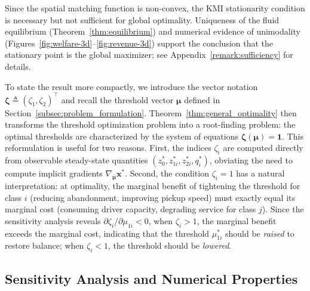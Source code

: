 \begin{remark}
\label{remark:global_optimality}
Since the spatial matching function is non-convex, the KMI stationarity condition is necessary but not sufficient for global optimality.
Uniqueness of the fluid equilibrium (Theorem~\ref{thm:equilibrium}) and numerical evidence of unimodality (Figures~\ref{fig:welfare-3d}--\ref{fig:revenue-3d}) support the conclusion that the stationary point is the global maximizer; see Appendix~\ref{remark:sufficiency} for details.
\end{remark}

To state the result more compactly, we introduce the vector notation $\boldsymbol{\zeta} \triangleq (\zeta_1, \zeta_2)^\top$ and recall the threshold vector $\boldsymbol{\mu}$ defined in Section~\ref{subsec:problem_formulation}.
Theorem~\ref{thm:general_optimality} then transforms the threshold optimization problem into a root-finding problem: the optimal thresholds are characterized by the system of equations $\boldsymbol{\zeta}(\boldsymbol{\mu}) = \mathbf{1}$.
This reformulation is useful for two reasons.
First, the indices $\zeta_i$ are computed directly from observable steady-state quantities $(z_0^*, z_{1i}^*, z_{2i}^*, q_i^*)$, obviating the need to compute implicit gradients $\nabla_{\boldsymbol{\mu}} \mathbf{x}^*$.
Second, the condition $\zeta_i = 1$ has a natural interpretation: at optimality, the marginal benefit of tightening the threshold for class $i$ (reducing abandonment, improving pickup speed) must exactly equal its marginal cost (consuming driver capacity, degrading service for class $j$).
Since the sensitivity analysis reveals $\partial \zeta_i / \partial \mu_{1i} < 0$, when $\zeta_i > 1$, the marginal benefit exceeds the marginal cost, indicating that the threshold $\mu_{1i}^*$ should be \emph{raised} to restore balance; when $\zeta_i < 1$, the threshold should be \emph{lowered}.

\subsection{Sensitivity Analysis and Numerical Properties}
\label{sec:sensitivity_analysis}

